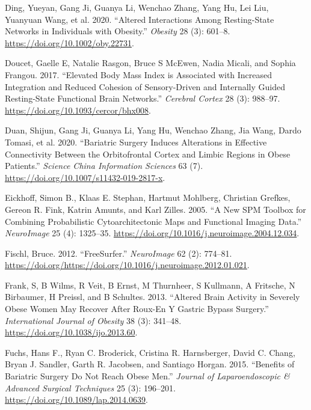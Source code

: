 \documentclass[
]{article}
\begin{document}
\leavevmode\hypertarget{ref-Ding_2020}{}%
Ding, Yueyan, Gang Ji, Guanya Li, Wenchao Zhang, Yang Hu, Lei Liu, Yuanyuan Wang, et al. 2020. ``Altered Interactions Among Resting-State Networks in Individuals with Obesity.'' \emph{Obesity} 28 (3): 601--8. \url{https://doi.org/10.1002/oby.22731}.

\leavevmode\hypertarget{ref-Doucet_2017}{}%
Doucet, Gaelle E, Natalie Rasgon, Bruce S McEwen, Nadia Micali, and Sophia Frangou. 2017. ``Elevated Body Mass Index is Associated with Increased Integration and Reduced Cohesion of Sensory-Driven and Internally Guided Resting-State Functional Brain Networks.'' \emph{Cerebral Cortex} 28 (3): 988--97. \url{https://doi.org/10.1093/cercor/bhx008}.

\leavevmode\hypertarget{ref-Duan_2020}{}%
Duan, Shijun, Gang Ji, Guanya Li, Yang Hu, Wenchao Zhang, Jia Wang, Dardo Tomasi, et al. 2020. ``Bariatric Surgery Induces Alterations in Effective Connectivity Between the Orbitofrontal Cortex and Limbic Regions in Obese Patients.'' \emph{Science China Information Sciences} 63 (7). \url{https://doi.org/10.1007/s11432-019-2817-x}.

\leavevmode\hypertarget{ref-Eickhoff_2005}{}%
Eickhoff, Simon B., Klaas E. Stephan, Hartmut Mohlberg, Christian Grefkes, Gereon R. Fink, Katrin Amunts, and Karl Zilles. 2005. ``A New SPM Toolbox for Combining Probabilistic Cytoarchitectonic Maps and Functional Imaging Data.'' \emph{NeuroImage} 25 (4): 1325--35. \url{https://doi.org/10.1016/j.neuroimage.2004.12.034}.

\leavevmode\hypertarget{ref-fs_cross}{}%
Fischl, Bruce. 2012. ``FreeSurfer.'' \emph{NeuroImage} 62 (2): 774--81. \url{https://doi.org/https://doi.org/10.1016/j.neuroimage.2012.01.021}.

\leavevmode\hypertarget{ref-Frank_2013}{}%
Frank, S, B Wilms, R Veit, B Ernst, M Thurnheer, S Kullmann, A Fritsche, N Birbaumer, H Preissl, and B Schultes. 2013. ``Altered Brain Activity in Severely Obese Women May Recover After Roux-En Y Gastric Bypass Surgery.'' \emph{International Journal of Obesity} 38 (3): 341--48. \url{https://doi.org/10.1038/ijo.2013.60}.

\leavevmode\hypertarget{ref-Fuchs_2015}{}%
Fuchs, Hans F., Ryan C. Broderick, Cristina R. Harnsberger, David C. Chang, Bryan J. Sandler, Garth R. Jacobsen, and Santiago Horgan. 2015. ``Benefits of Bariatric Surgery Do Not Reach Obese Men.'' \emph{Journal of Laparoendoscopic \& Advanced Surgical Techniques} 25 (3): 196--201. \url{https://doi.org/10.1089/lap.2014.0639}.
\end{document}
